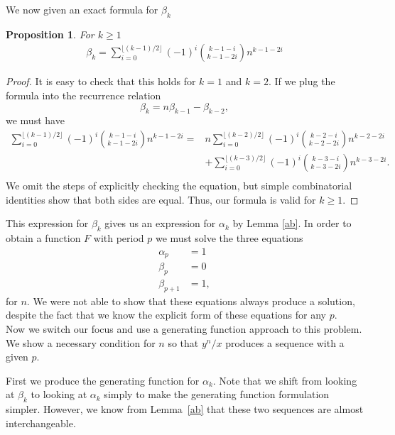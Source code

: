\documentclass[12pt]{article}
\newtheorem{proposition}{Proposition}
\begin{document}
We now given an exact formula for $\beta_k$ 
\begin{proposition} 
For $k \geq 1$
\begin{align*}
\beta_k =\sum_{i = 0}^{\lfloor (k-1)/2 \rfloor} (-1)^i\binom{k-1-i}{k-1-2i}n^{k-1-2i}
\end{align*}
\end{proposition}
\begin{proof}
It is easy to check that this holds for $k = 1$ and $k = 2$.  If we plug the formula into the recurrence relation
\begin{equation*}
\beta_k = n\beta_{k-1} - \beta_{k-2},
\end{equation*}
we must have 
\begin{align*}
\sum_{i = 0}^{\lfloor (k-1)/2 \rfloor} (-1)^i\binom{k-1-i}{k-1-2i}n^{k-1-2i} = & n \sum_{i = 0}^{\lfloor (k-2)/2 \rfloor} (-1)^i\binom{k-2-i}{k-2-2i}n^{k-2-2i} \\
& +\sum_{i = 0}^{\lfloor (k-3)/2 \rfloor} (-1)^i\binom{k-3-i}{k-3-2i}n^{k-3-2i}.\\
\end{align*}
We omit the steps of explicitly checking the equation, but simple combinatorial identities show that both sides are equal. Thus, our formula is valid for $k \geq 1$.
\end{proof}

This expression for $\beta_k$ gives us an expression for $\alpha_k$ by Lemma \ref{ab}. In order to obtain a function $F$ with period $p$ we must solve the three equations
\begin{align*}
\alpha_p &=1 \\
\beta_p &=0\\ 
\beta_{p+1} &= 1,
\end{align*}
for $n$. We were not able to show that these equations always produce a solution, despite the fact that we know the explicit form of these equations for any $p$.
\\ 


Now we switch our focus and use a generating function approach to this problem. We show a necessary condition for $n$ so that $y^n/x$ produces a sequence with a given $p$.

First we produce the generating function for $\alpha_k$. Note that we shift from looking at $\beta_k$ to looking at $\alpha_k$ simply to make the generating function formulation simpler. However, we know from Lemma~\ref{ab} that these two sequences are almost interchangeable.
\end{document}
